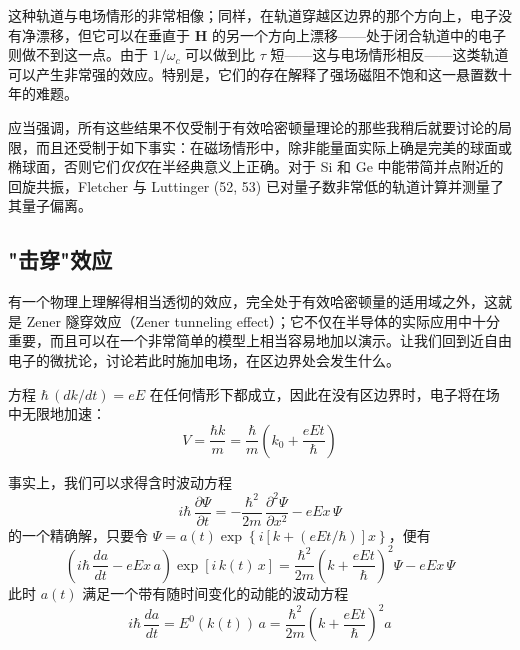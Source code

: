 这种轨道与电场情形的非常相像；同样，在轨道穿越区边界的那个方向上，电子没有净漂移，但它可以在垂直于 $\mathbf{H}$ 的另一个方向上漂移——处于闭合轨道中的电子则做不到这一点。由于 $1/\omega_c$ 可以做到比 $\tau$ 短——这与电场情形相反——这类轨道可以产生非常强的效应。特别是，它们的存在解释了强场磁阻不饱和这一悬置数十年的难题。

应当强调，所有这些结果不仅受制于有效哈密顿量理论的那些我稍后就要讨论的局限，而且还受制于如下事实：在磁场情形中，除非能量面实际上确是完美的球面或椭球面，否则它们\emph{仅仅}在半经典意义上正确。对于 Si 和 Ge 中能带简并点附近的回旋共振，Fletcher 与 Luttinger (52, 53) 已对量子数非常低的轨道计算并测量了其量子偏离。


\subsection{"击穿"效应}

有一个物理上理解得相当透彻的效应，完全处于有效哈密顿量的适用域之外，这就是 Zener 隧穿效应（Zener tunneling effect）；它不仅在半导体的实际应用中十分重要，而且可以在一个非常简单的模型上相当容易地加以演示。让我们回到近自由电子的微扰论，讨论若此时施加电场，在区边界处会发生什么。

方程 $\hbar\,(dk/dt) = eE$ 在任何情形下都成立，因此在没有区边界时，电子将在场中无限地加速：
\begin{equation*}
V = \frac{\hbar k}{m} = \frac{\hbar}{m}\left(k_0 + \frac{eEt}{\hbar}\right)
\end{equation*}

事实上，我们可以求得含时波动方程
\begin{equation*}
i\hbar\,\frac{\partial\Psi}{\partial t} = -\frac{\hbar^2}{2m}\,\frac{\partial^2\Psi}{\partial x^2} - eEx\,\Psi
\end{equation*}
的一个精确解，只要令 $\Psi = a(t)\exp\left\{i\left[k+(eEt/\hbar)\right]x\right\}$，便有
\begin{equation*}
\left(i\hbar\,\frac{da}{dt} - eEx\,a\right)\exp[i\,k(t)\,x] = \frac{\hbar^2}{2m}\left(k+\frac{eEt}{\hbar}\right)^{\!2}\Psi - eEx\,\Psi
\end{equation*}
此时 $a(t)$ 满足一个带有随时间变化的动能的波动方程
\begin{equation*}
i\hbar\,\frac{da}{dt} = E^0(k(t))\,a = \frac{\hbar^2}{2m}\left(k+\frac{eEt}{\hbar}\right)^{\!2}a
\end{equation*}

